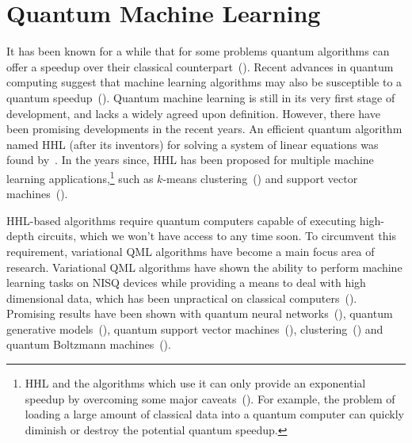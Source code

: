 \documentclass[a4paper,10pt]{article}
\begin{document}
\section{Quantum Machine Learning} \label{sec:quantum-ml}
It has been known for a while that for some problems quantum algorithms can offer a speedup over their classical counterpart~(\cite{nielsen-chuang}).
Recent advances in quantum computing suggest that machine learning algorithms may also be susceptible to a quantum speedup~(\cite{lee2019experimental, lloyd2013quantum, gao2018quantum, yoo2014quantum, biamonte2017quantum}).
Quantum machine learning is still in its very first stage of development, and lacks a widely agreed upon definition.
However, there have been promising developments in the recent years.
An efficient quantum algorithm named HHL (after its inventors) for solving a system of linear equations was found by~\cite{harrow2009quantum}.
In the years since, HHL has been proposed for multiple machine learning applications,\footnote{HHL and the algorithms which use it can only provide an exponential speedup by overcoming some major caveats~(\cite{aaronson2015read}). For example, the problem of loading a large amount of classical data into a quantum computer can quickly diminish or destroy the potential quantum speedup.} such as $k$-means clustering~(\cite{lloyd2013quantum}) and support vector machines~(\cite{rebentrost2014quantum}).

HHL-based algorithms require quantum computers capable of executing high-depth circuits, which we won't have access to any time soon.
To circumvent this requirement, variational QML algorithms have become a main focus area of research.
Variational QML algorithms have shown the ability to perform machine learning tasks on NISQ devices while providing a means to deal with high dimensional data, which has been unpractical on classical computers~(\cite{mitarai2018quantum}).
Promising results have been shown with quantum neural networks~(\cite{qnn-near-term, schuld2018circuit, fanizza2019optimal, grant2018hierarchical}), quantum generative models~(\cite{romero2019variational, benedetti2019adversarial, benedetti2019generative}), quantum support vector machines~(\cite{havlivcek2019supervised, schuld2019quantum, ghobadi2019power}), clustering~(\cite{otterbach2017unsupervised}) and quantum Boltzmann machines~(\cite{verdon2017quantum, anschuetz2019realizing}).
\end{document}
